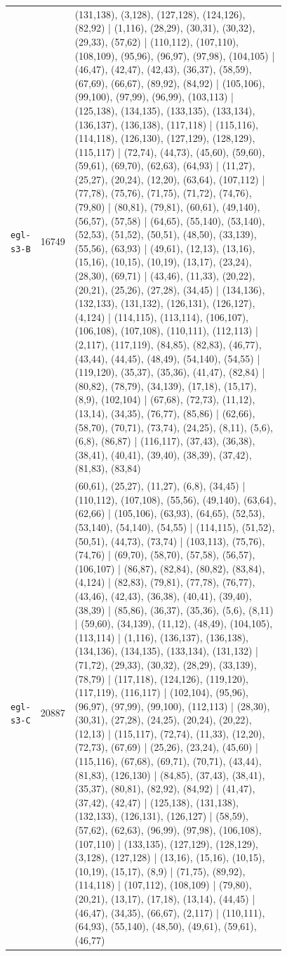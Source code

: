 \begin{landscape}
\begin{longtable}{lr>{\tiny\raggedright\arraybackslash}p{0.78\linewidth}}
\texttt{egl-s3-B} & 16749 & (131,138), (3,128), (127,128), (124,126), (82,92) | (1,116), (28,29), (30,31), (30,32), (29,33), (57,62) | (110,112), (107,110), (108,109), (95,96), (96,97), (97,98), (104,105) | (46,47), (42,47), (42,43), (36,37), (58,59), (67,69), (66,67), (89,92), (84,92) | (105,106), (99,100), (97,99), (96,99), (103,113) | (125,138), (134,135), (133,135), (133,134), (136,137), (136,138), (117,118) | (115,116), (114,118), (126,130), (127,129), (128,129), (115,117) | (72,74), (44,73), (45,60), (59,60), (59,61), (69,70), (62,63), (64,93) | (11,27), (25,27), (20,24), (12,20), (63,64), (107,112) | (77,78), (75,76), (71,75), (71,72), (74,76), (79,80) | (80,81), (79,81), (60,61), (49,140), (56,57), (57,58) | (64,65), (55,140), (53,140), (52,53), (51,52), (50,51), (48,50), (33,139), (55,56), (63,93) | (49,61), (12,13), (13,16), (15,16), (10,15), (10,19), (13,17), (23,24), (28,30), (69,71) | (43,46), (11,33), (20,22), (20,21), (25,26), (27,28), (34,45) | (134,136), (132,133), (131,132), (126,131), (126,127), (4,124) | (114,115), (113,114), (106,107), (106,108), (107,108), (110,111), (112,113) | (2,117), (117,119), (84,85), (82,83), (46,77), (43,44), (44,45), (48,49), (54,140), (54,55) | (119,120), (35,37), (35,36), (41,47), (82,84) | (80,82), (78,79), (34,139), (17,18), (15,17), (8,9), (102,104) | (67,68), (72,73), (11,12), (13,14), (34,35), (76,77), (85,86) | (62,66), (58,70), (70,71), (73,74), (24,25), (8,11), (5,6), (6,8), (86,87) | (116,117), (37,43), (36,38), (38,41), (40,41), (39,40), (38,39), (37,42), (81,83), (83,84) \\[2pt]
\texttt{egl-s3-C} & 20887 & (60,61), (25,27), (11,27), (6,8), (34,45) | (110,112), (107,108), (55,56), (49,140), (63,64), (62,66) | (105,106), (63,93), (64,65), (52,53), (53,140), (54,140), (54,55) | (114,115), (51,52), (50,51), (44,73), (73,74) | (103,113), (75,76), (74,76) | (69,70), (58,70), (57,58), (56,57), (106,107) | (86,87), (82,84), (80,82), (83,84), (4,124) | (82,83), (79,81), (77,78), (76,77), (43,46), (42,43), (36,38), (40,41), (39,40), (38,39) | (85,86), (36,37), (35,36), (5,6), (8,11) | (59,60), (34,139), (11,12), (48,49), (104,105), (113,114) | (1,116), (136,137), (136,138), (134,136), (134,135), (133,134), (131,132) | (71,72), (29,33), (30,32), (28,29), (33,139), (78,79) | (117,118), (124,126), (119,120), (117,119), (116,117) | (102,104), (95,96), (96,97), (97,99), (99,100), (112,113) | (28,30), (30,31), (27,28), (24,25), (20,24), (20,22), (12,13) | (115,117), (72,74), (11,33), (12,20), (72,73), (67,69) | (25,26), (23,24), (45,60) | (115,116), (67,68), (69,71), (70,71), (43,44), (81,83), (126,130) | (84,85), (37,43), (38,41), (35,37), (80,81), (82,92), (84,92) | (41,47), (37,42), (42,47) | (125,138), (131,138), (132,133), (126,131), (126,127) | (58,59), (57,62), (62,63), (96,99), (97,98), (106,108), (107,110) | (133,135), (127,129), (128,129), (3,128), (127,128) | (13,16), (15,16), (10,15), (10,19), (15,17), (8,9) | (71,75), (89,92), (114,118) | (107,112), (108,109) | (79,80), (20,21), (13,17), (17,18), (13,14), (44,45) | (46,47), (34,35), (66,67), (2,117) | (110,111), (64,93), (55,140), (48,50), (49,61), (59,61), (46,77) \\[2pt]

\end{longtable}
\end{landscape}
